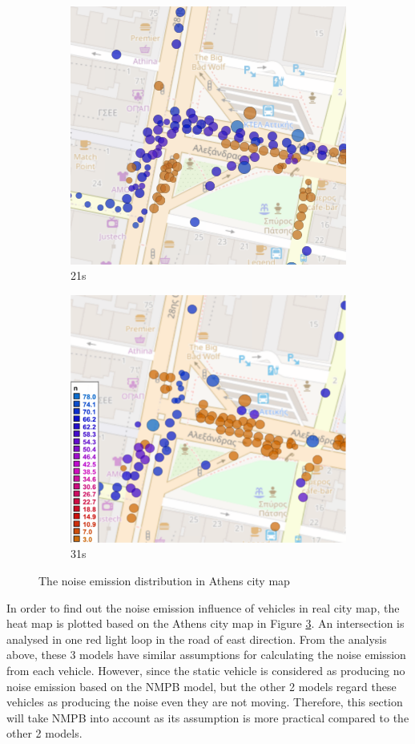 \documentclass{article}
\begin{document}
\begin{figure}[h]
\newline

\begin{subfigure}{.5\textwidth}
  \centering
  \includegraphics[width=.8\linewidth]{21s.png}  
  \caption{21s}
  \label{fig:sub-third}
\end{subfigure}
\begin{subfigure}{.5\textwidth}
  \centering
  \includegraphics[width=.8\linewidth]{31s(1).png}  
  \caption{31s}
  \label{fig:sub-fourth}
\end{subfigure}
\caption{The noise emission distribution in Athens city map}
\label{fig:fig}
\end{figure}
\noindent In order to find out the noise emission influence of vehicles in real city map, the heat map is plotted based on the Athens city map in Figure \ref{fig:fig}. An intersection is analysed in one red light loop in the road of east direction. From the analysis above, these 3 models have similar assumptions for calculating the noise emission from each vehicle. However, since the static vehicle is considered as producing no noise emission based on the NMPB model, but the other 2 models regard these vehicles as producing the noise even they are not moving. Therefore, this section will take NMPB into account as its assumption is more practical compared to the other 2 models.
\end{document}
